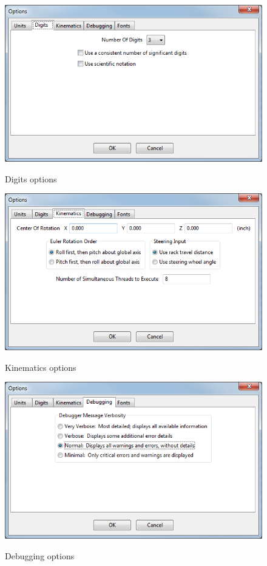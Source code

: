 \begin{figure}
\includegraphics[width=\textwidth]{images/optionsDigits} \label{fig:optionsDigits}
\caption{Digits options}
\centering
\end{figure}

\begin{figure}
\includegraphics[width=\textwidth]{images/optionsKinematics} \label{fig:optionsKinematics}
\caption{Kinematics options}
\centering
\end{figure}

\begin{figure}
\includegraphics[width=\textwidth]{images/optionsDebugging} \label{fig:optionsDebugging}
\caption{Debugging options}
\centering
\end{figure}

